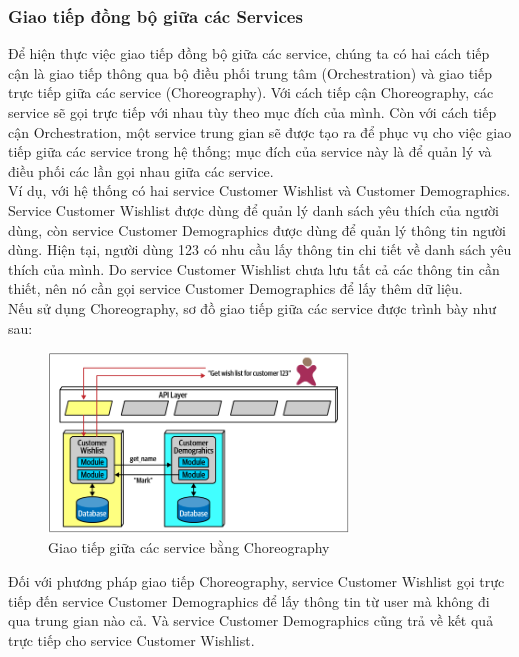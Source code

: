 \newpage



\subsubsection{Giao tiếp đồng bộ giữa các Services}

\hspace*{0.5cm} Để hiện thực việc giao tiếp đồng bộ giữa các service, chúng ta có hai cách tiếp cận là giao tiếp thông qua bộ điều phối trung tâm (Orchestration) và giao tiếp trực tiếp giữa các service (Choreography). Với cách tiếp cận Choreography, các service sẽ gọi trực tiếp với nhau tùy theo mục đích của mình. Còn với cách tiếp cận Orchestration, một service trung gian sẽ được tạo ra để phục vụ cho việc giao tiếp giữa các service trong hệ thống; mục đích của service này là để quản lý và điều phối các lần gọi nhau giữa các service.\\

Ví dụ, với hệ thống có hai service Customer Wishlist và Customer Demographics. Service Customer Wishlist được dùng để quản lý danh sách yêu thích của người dùng, còn service Customer Demographics được dùng để quản lý thông tin người dùng. Hiện tại, người dùng 123 có nhu cầu lấy thông tin chi tiết về danh sách yêu thích của mình. Do service Customer Wishlist chưa lưu tất cả các thông tin cần thiết, nên nó cần gọi service Customer Demographics để lấy thêm dữ liệu.\\

Nếu sử dụng Choreography, sơ đồ giao tiếp giữa các service được trình bày như sau:
\begin{figure}[!htp]
	\centering
	\includegraphics[width=8cm]{img/Architecture/choreography.PNG}
	\newline
	\caption{Giao tiếp giữa các service bằng Choreography \cite{archChoreography}}
\end{figure}

Đối với phương pháp giao tiếp Choreography, service Customer Wishlist gọi trực tiếp đến service Customer Demographics để lấy thông tin từ user mà không đi qua trung gian nào cả. Và service Customer Demographics cũng trả về kết quả trực tiếp cho service Customer Wishlist.\\

